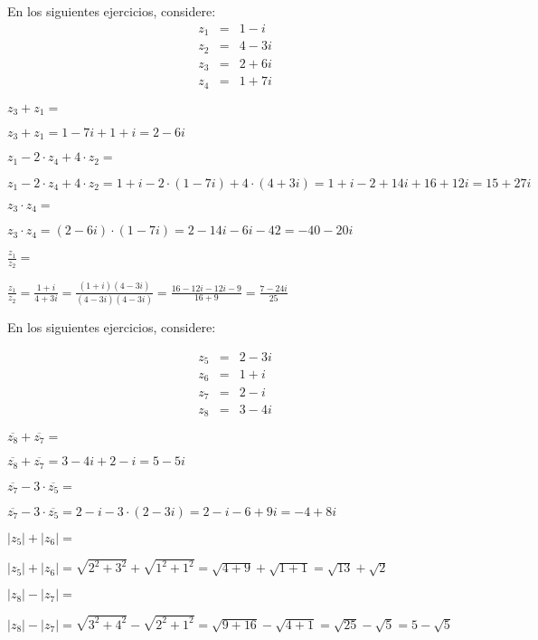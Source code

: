 \documentclass[12pt,addpoints,x11names]{exam}
\begin{document}
\begin{questions}
En los siguientes ejercicios, considere:
\begin{eqnarray*}
  z_1&=&1-i\\
  z_2&=&4-3i\\
  z_3&=&2+6i\\
  z_4&=&1+7i
\end{eqnarray*}
 
\question[3] $z_3+z_1=$
  \begin{solutionbox}{1.2in}
     $z_3+z_1=1-7i+1+i=2-6i$
  \end{solutionbox}
\question[3] $z_1-2\cdot z_4+4\cdot z_2=$
  \begin{solutionbox}{1.2in}
     $z_1-2\cdot z_4+4\cdot z_2=1+i-2\cdot(1-7i)+4\cdot(4+3i)=1+i-2+14i+16+12i=15+27i$
  \end{solutionbox}
\question[3] $z_3\cdot z_4=$
  \begin{solutionbox}{1.2in}
     $z_3\cdot z_4=(2-6i)\cdot(1-7i)=2-14i-6i-42=-40-20i$
  \end{solutionbox}
\question[3] $\frac{z_1}{z_2}=$
  \begin{solutionbox}{1.2in}
     $\frac{z_1}{z_2}=\frac{1+i}{4+3i}=\frac{(1+i)(4-3i)}{(4-3i)(4-3i)}=\frac{16-12i-12i-9}{16+9}=\frac{7-24i}{25}$
  \end{solutionbox}
\pagebreak

En los siguientes ejercicios, considere:

\begin{eqnarray*}
  z_5&=&2-3i\\
  z_6&=&1+i\\
  z_7&=&2-i\\
  z_8&=&3-4i
\end{eqnarray*}

\question[3] $\overline{z_8}+\overline{z_7}=$
   \begin{solutionbox}{1.3in}
     $\overline{z_8}+\overline{z_7}=3-4i+2-i=5-5i$
  \end{solutionbox}
\question[3] $\overline{z_7}-3\cdot\overline{z_5}=$
   \begin{solutionbox}{1.3in}
     $\overline{z_7}-3\cdot\overline{z_5}=2-i-3\cdot(2-3i)=2-i-6+9i=-4+8i$
  \end{solutionbox}
\question[3] $|z_5|+|z_6|=$
   \begin{solutionbox}{1.3in}
     $|z_5|+|z_6|=\sqrt{2^{2}+3^{2}}+\sqrt{1^{2}+1^{2}}=\sqrt{4+9}+\sqrt{1+1}=\sqrt{13}+\sqrt{2}$
  \end{solutionbox}
\question[3] $|z_8|-|z_7|=$
  \begin{solutionbox}{1.3in}
     $|z_8|-|z_7|=\sqrt{3^{2}+4^{2}}-\sqrt{2^{2}+1^{2}}=\sqrt{9+16}-\sqrt{4+1}=\sqrt{25}-\sqrt{5}=5-\sqrt{5}$
  \end{solutionbox}
\end{questions}
\end{document}

